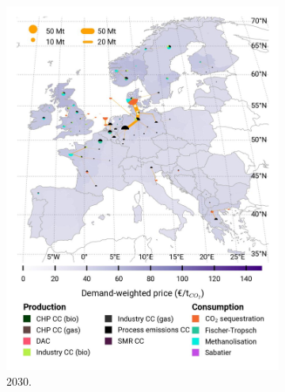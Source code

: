 \documentclass[preprint,12pt,sort&compress]{elsarticle}
\begin{document}
\begin{figure}[htbp]
\begin{subfigure}[t]{0.33\textwidth}
      \includegraphics[width=1\textwidth]{maps/greenfield-pipelines/base_s_adm___2030-balance_map_co2_stored} 
      \caption{ 2030.}
      \label{fig:CP_lt_2030_co2}
  \end{subfigure}
  \begin{subfigure}[t]{0.33\textwidth}
      \vspace{0pt}

\end{subfigure}
\end{figure}
\end{document}
